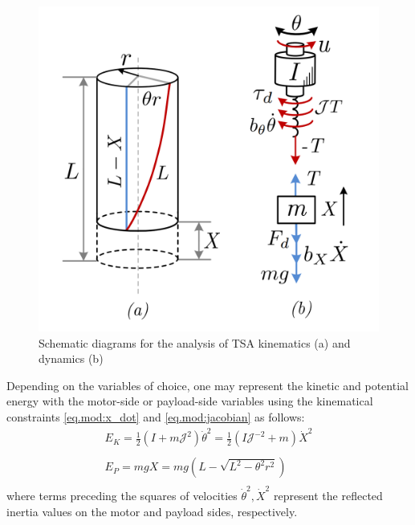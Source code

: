 \begin{figure}
		\centering
		\vspace*{2mm} 
		\includegraphics[trim= 0.0cm 1.0cm 0.0cm 0.0cm,width=0.72\columnwidth]{pics/tsa_scheme.PNG}
		\caption{Schematic diagrams for the analysis of TSA kinematics (a) and dynamics (b)}
		\label{fig:schematic_diagram}
\end{figure}
Depending on the variables of choice, one may represent the kinetic and potential energy with the motor-side or payload-side variables using the kinematical constraints \eqref{eq.mod:x_dot} and \eqref{eq.mod:jacobian} as follows:
\begin{equation}\label{eq.mod:K_Pi_energies}
\begin{matrix}
    E_K = \frac{1}{2} (I + m \mathcal{J}^2)\dot{\theta}^2 = \frac{1}{2} (I\mathcal{J}^{-2} + m )\dot{X}^2 \\ 
    \\
    E_P = mgX = mg (L - \sqrt{L^2 - \theta^2r^2} )  \\ 
\end{matrix}
\end{equation}
where terms preceding the squares of velocities $\dot{\theta}^2, \dot{X}^2$ represent the reflected inertia values on the motor and payload sides, respectively. 

